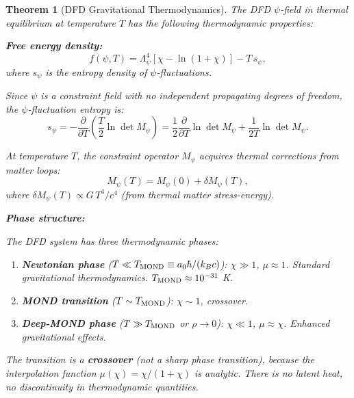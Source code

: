 \documentclass[11pt,a4paper]{article}
\newtheorem{theorem}{Theorem}
\begin{document}
\begin{theorem}[DFD Gravitational Thermodynamics]
\label{thm:thermo}
The DFD $\psi$-field in thermal equilibrium at temperature $T$ has the following thermodynamic properties:

\textbf{Free energy density:}
\begin{equation}
f(\psi, T) = \Lambda_\psi^4\left[\chi - \ln(1+\chi)\right] - T\,s_\psi,
\end{equation}
where $s_\psi$ is the entropy density of $\psi$-fluctuations.

Since $\psi$ is a constraint field with no independent propagating degrees of freedom, the $\psi$-fluctuation entropy is:
\begin{equation}
s_\psi = -\frac{\partial}{\partial T}\left(\frac{T}{2}\ln\det M_\psi\right) = \frac{1}{2}\frac{\partial}{\partial T}\ln\det M_\psi + \frac{1}{2T}\ln\det M_\psi.
\end{equation}

At temperature $T$, the constraint operator $M_\psi$ acquires thermal corrections from matter loops:
\begin{equation}
M_\psi(T) = M_\psi(0) + \delta M_\psi(T),
\end{equation}
where $\delta M_\psi(T) \propto G\,T^4/c^4$ (from thermal matter stress-energy).

\textbf{Phase structure:}

The DFD system has three thermodynamic phases:
\begin{enumerate}
\item \textbf{Newtonian phase} ($T \ll T_{\rm MOND} \equiv a_0\hbar/(k_B c)$): $\chi \gg 1$, $\mu \approx 1$. Standard gravitational thermodynamics. $T_{\rm MOND} \approx 10^{-31}$ K.
\item \textbf{MOND transition} ($T \sim T_{\rm MOND}$): $\chi \sim 1$, crossover.
\item \textbf{Deep-MOND phase} ($T \gg T_{\rm MOND}$ or $\rho \to 0$): $\chi \ll 1$, $\mu \approx \chi$. Enhanced gravitational effects.
\end{enumerate}

The transition is a \textbf{crossover} (not a sharp phase transition), because the interpolation function $\mu(\chi) = \chi/(1+\chi)$ is analytic. There is no latent heat, no discontinuity in thermodynamic quantities.
\end{theorem}
\end{document}
